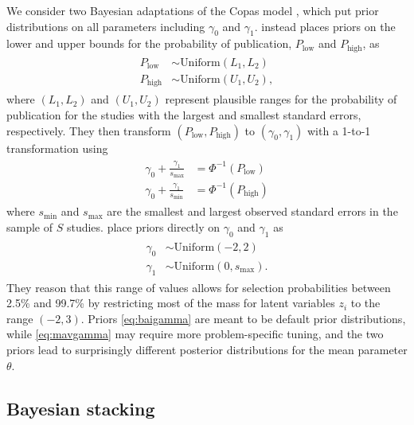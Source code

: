 \documentclass[12pt]{article}   	%
\numberwithin{equation}{section}
\begin{document}
We consider two Bayesian adaptations of the Copas model \citep{mavridis2013copas, bai2020}, which put prior distributions on all parameters including $\gamma_0$ and $\gamma_1$. \citet{mavridis2013copas} instead places priors on the lower and upper bounds for the probability of publication, $P_{\text{low}}$ and $P_{\text{high}}$, as
\begin{align}
\begin{split}
P_{\text{low}} & \sim \text{Uniform}(L_1, L_2) \\
P_{\text{high}} & \sim \text{Uniform}(U_1, U_2), \label{eq:mavgamma}
\end{split}
\end{align} 
where $(L_1, L_2)$ and $(U_1, U_2)$ represent plausible ranges for the probability of publication for the studies with the largest and smallest standard errors, respectively. They then transform $(P_{\text{low}}, P_{\text{high}})$ to $(\gamma_0, \gamma_1)$ with a 1-to-1 transformation using
\begin{align}
\begin{split}
\gamma_0 + \frac{\gamma_1}{s_{\text{max}}} &= \Phi^{-1}(P_{\text{low}}) \\
\gamma_0 + \frac{\gamma_1}{s_{\text{min}}} &= \Phi^{-1}(P_{\text{high}})
\end{split}
\end{align} 
where $s_{\text{min}}$ and $s_{\text{max}}$ are the smallest and largest observed standard errors in the sample of $S$ studies. \citet{bai2020} place priors directly on $\gamma_0$ and $\gamma_1$ as
\begin{align}
\begin{split}
\gamma_0 & \sim \text{Uniform}(-2, 2) \\
\gamma_1 & \sim \text{Uniform}(0, s_{\text{max}}). \label{eq:baigamma}
\end{split}
\end{align}
They reason that this range of values allows for selection probabilities between 2.5\% and 99.7\% by restricting most of the mass for latent variables $z_i$ to the range $(-2, 3)$.
Priors \eqref{eq:baigamma} are meant to be default prior distributions, while \eqref{eq:mavgamma} may require more problem-specific tuning, and the two priors lead to surprisingly different posterior distributions for the mean parameter $\theta$. 

\subsection{Bayesian stacking} \label{sec:stacking}
\end{document}
